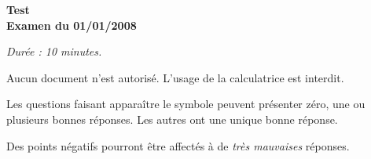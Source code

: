 


\vspace*{.5cm}
\begin{minipage}{.4\linewidth}

\centering\large\bf Test\\ Examen du 01/01/2008\end{minipage}

         
\hspace*{\fill}
\hspace*{\fill}

\begin{center}\em
Durée : 10 minutes.

  Aucun document n'est autorisé.
  L'usage de la calculatrice est interdit.

  Les questions faisant apparaître le symbole \multiSymbole{} peuvent
  présenter zéro, une ou plusieurs bonnes réponses. Les autres ont
  une unique bonne réponse.

  Des points négatifs pourront être affectés à de \emph{très
    mauvaises} réponses.
\end{center}
\vspace{1ex}

